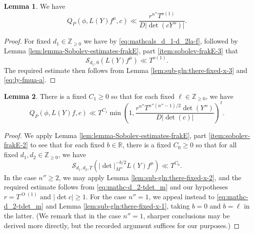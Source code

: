 \documentclass[reqno]{amsart}
\def\O{\operatorname{O}}
\theoremstyle{plain} \newtheorem{theorem} {Theorem}
\theoremstyle{definition} \newtheorem{definition} [theorem] {Definition}
\theoremstyle{itplain} %
\newtheorem{lemma}[theorem]{Lemma}
\numberwithin{equation}{section}
\numberwithin{theorem}{section}
\renewcommand{\geq}{\geqslant}
\begin{document}
\begin{lemma}\label{lemma:20230514162116}
  We have
  \begin{equation}\label{eq:q_pphi-f-c}
  Q_P(\phi, L(Y) f^\mu,c) \ll \frac{r^{n''} T^{o(1)}}{D |\det (c Y'')| }.
\end{equation}
\end{lemma}
\begin{proof}
  For fixed $d_1 \in \mathbb{Z}_{\geq 0}$ we have by \eqref{eq:mathcals_d_1-d_2la-f}, followed by Lemma \ref{lem:lemma-Sobolev-estimates-frakE}, part \eqref{item:sobolev-frakE-3} that
\begin{equation*}
  \mathcal{S}_{d_1,0}(L(Y) f^{\mu})
  \ll
  T^{o(1)}.
\end{equation*}
The required estimate then follows from Lemma \ref{lem:sub-gln:there-fixed-x-3} and \eqref{eq:ly-fmua-a}.
\end{proof}

\begin{lemma}\label{lemma:20230514162141}
  There is a fixed $C_1 \geq 0$ so that for each fixed $\ell \in \mathbb{Z}_{\geq 0}$, we have
  \begin{equation}\label{eq:q_pphi-f-c-1}
    Q_P(\phi,L(Y) f,c) \ll T^{C_1}
    \min \left( 1,
      \frac{r^{n''} T^{n''(n''-1)/2} \det(Y'')}{D |\det (c)|}
    \right)^{\ell }.
  \end{equation}
\end{lemma}
\begin{proof}
  We apply Lemma \ref{lem:lemma-Sobolev-estimates-frakE}, part \eqref{item:sobolev-frakE-2} to see that for each fixed $b \in \mathbb{R}$, there is a fixed $C_0 \geq 0$ so that for all fixed  $d_1,d_2 \in \mathbb{Z}_{\geq 0}$, we have
  \begin{equation}\label{eq:mathc-d_2-tdet_m}
    \mathcal{S}_{d_1, d_2, T}(|\det|_{M''}^{-b/2} L(Y) f^{\mu}) \ll T^{C_0}.
  \end{equation}
  In the case $n'' \geq 2$, we may apply Lemma \ref{lem:sub-gln:there-fixed-x-2}, and the required estimate follows from \eqref{eq:mathc-d_2-tdet_m} and our hypotheses $r = T^{\O(1)}$ and $|\det c| \geq 1$.  For the case $n'' = 1$, we appeal instead to \eqref{eq:mathc-d_2-tdet_m} and Lemma \ref{lem:sub-gln:there-fixed-x-1}, taking $b = 0$ and $b = \ell$ in the latter.  (We remark that in the case $n'' = 1$, sharper conclusions may be derived more directly, but the recorded argument suffices for our purposes.)
\end{proof}
\end{document}
